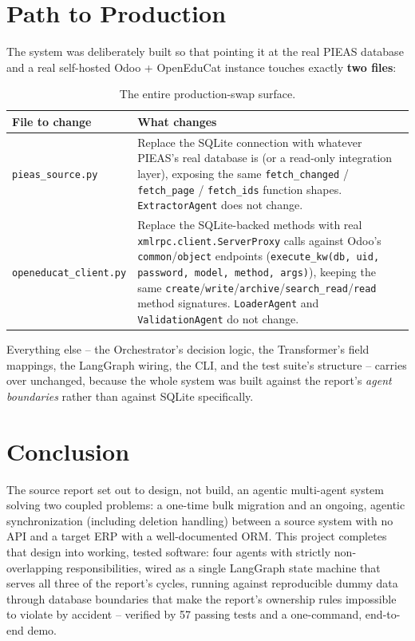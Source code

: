 \documentclass[11pt,a4paper]{article}
\begin{document}
\section{Path to Production}

The system was deliberately built so that pointing it at the real PIEAS database and a real
self-hosted Odoo + OpenEduCat instance touches exactly \textbf{two files}:

\begin{table}[H]
\centering
\small
\begin{tabular}{@{}p{3.6cm}p{10.4cm}@{}}
\toprule
\textbf{File to change} & \textbf{What changes} \\
\midrule
\texttt{pieas\_source.py} & Replace the SQLite connection with whatever PIEAS's real database
is (or a read-only integration layer), exposing the same \texttt{fetch\_changed} /
\texttt{fetch\_page} / \texttt{fetch\_ids} function shapes. \texttt{ExtractorAgent} does not
change. \\
\texttt{openeducat\_client.py} & Replace the SQLite-backed methods with real
\texttt{xmlrpc.client.ServerProxy} calls against Odoo's \texttt{common}/\texttt{object}
endpoints (\texttt{execute\_kw(db, uid, password, model, method, args)}), keeping the same
\texttt{create}/\texttt{write}/\texttt{archive}/\texttt{search\_read}/\texttt{read} method
signatures. \texttt{LoaderAgent} and \texttt{ValidationAgent} do not change. \\
\bottomrule
\end{tabular}
\caption{The entire production-swap surface.}
\end{table}

Everything else -- the Orchestrator's decision logic, the Transformer's field mappings, the
LangGraph wiring, the CLI, and the test suite's structure -- carries over unchanged, because the
whole system was built against the report's \emph{agent boundaries} rather than against SQLite
specifically.

\section{Conclusion}

The source report set out to design, not build, an agentic multi-agent system solving two
coupled problems: a one-time bulk migration and an ongoing, agentic synchronization (including
deletion handling) between a source system with no API and a target ERP with a well-documented
ORM. This project completes that design into working, tested software: four agents with
strictly non-overlapping responsibilities, wired as a single LangGraph state machine that serves
all three of the report's cycles, running against reproducible dummy data through database
boundaries that make the report's ownership rules impossible to violate by accident -- verified
by 57 passing tests and a one-command, end-to-end demo.
\end{document}
